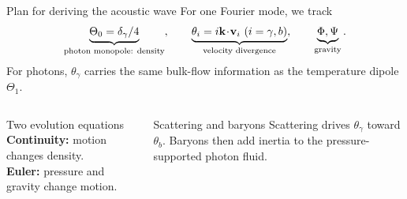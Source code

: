 \begin{frame}{Plan for deriving the acoustic wave}
For one Fourier mode, we track
\[
\underbrace{\Theta_0=\delta_\gamma/4}_{\text{photon monopole: density}},\qquad
\underbrace{\theta_i=i\mathbf k\!\cdot\!\mathbf v_i\ (i=\gamma,b)}_{\text{velocity divergence}},\qquad
\underbrace{\Phi,\Psi}_{\text{gravity}}.
\]
For photons, $\theta_\gamma$ carries the same bulk-flow information as the temperature dipole $\Theta_1$.
\begin{columns}[T]
\begin{block}{Two evolution equations}
\textbf{Continuity:} motion changes density.\\[1mm]
\textbf{Euler:} pressure and gravity change motion.
\end{block}
\begin{block}{Scattering and baryons}
Scattering drives $\theta_\gamma$ toward $\theta_b$. Baryons then add inertia to the pressure-supported photon fluid.
\end{block}
\end{columns}
\end{frame}


